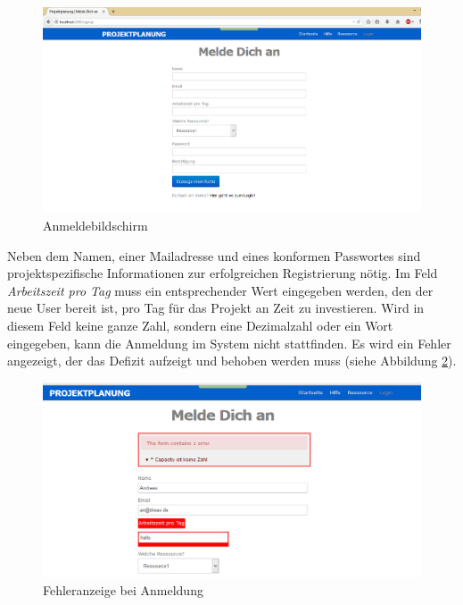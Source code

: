 \documentclass[a4paper,12pt,parskip,bibtotoc,liststotoc]{article}
\begin{document}
\begin{figure}[h!]
  \begin{center}
    \includegraphics[width=120mm]{Bilder/Anmeldung.png}
    \caption{Anmeldebildschirm}  \label{Anm}
  \end{center}
\end{figure}

Neben dem Namen, einer Mailadresse und eines konformen Passwortes sind projektspezifische Informationen zur erfolgreichen Registrierung nötig. Im Feld \textit{Arbeitszeit pro Tag} muss ein entsprechender Wert eingegeben werden, den der neue User bereit ist, pro Tag für das Projekt an Zeit zu investieren. Wird in diesem Feld keine ganze Zahl, sondern eine Dezimalzahl oder ein Wort eingegeben, kann die Anmeldung im System nicht stattfinden. Es wird ein Fehler angezeigt, der das Defizit aufzeigt und behoben werden muss (siehe Abbildung \ref{Fehler}).\\

\begin{figure}[h!]
  \begin{center}
    \includegraphics[width=120mm]{Bilder/Anmeldung_Fehleranzeige.png}
    \caption{Fehleranzeige bei Anmeldung}  \label{Fehler}
  \end{center}
\end{figure}
\end{document}

